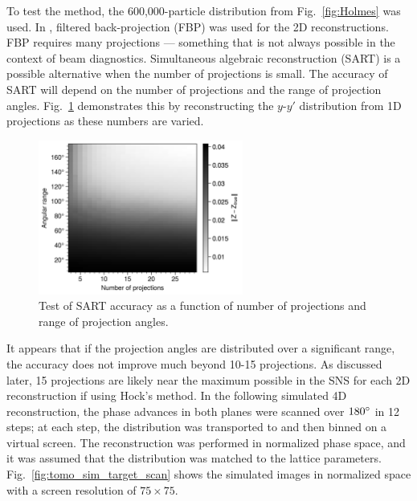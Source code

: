 To test the method, the 600,000-particle distribution from Fig.~\ref{fig:Holmes} was used. In \cite{Hock2013a}, filtered back-projection (FBP) was used for the 2D reconstructions. FBP requires many projections — something that is not always possible in the context of beam diagnostics. Simultaneous algebraic reconstruction (SART) is a possible alternative when the number of projections is small. The accuracy of SART will depend on the number of projections and the range of projection angles. Fig.~\ref{fig:tomo_sim_art2D} demonstrates this by reconstructing the $y$-$y'$ distribution from 1D projections as these numbers are varied.
%
\begin{figure}[!p]
    \centering
    \vspace*{3.0cm}
    \includegraphics[width=0.6\textwidth]{Images/chapter4/tomo_sim_art2d.png}
    \caption{Test of SART accuracy as a function of number of projections and range of projection angles.}
    \label{fig:tomo_sim_art2D}
    \vspace*{3.0cm}
\end{figure}
%
It appears that if the projection angles are distributed over a significant range, the accuracy does not improve much beyond 10-15 projections. As discussed later, 15 projections are likely near the maximum possible in the SNS for each 2D reconstruction if using Hock's method. In the following simulated 4D reconstruction, the phase advances in both planes were scanned over $180\degree$ in 12 steps; at each step, the distribution was transported to and then binned on a virtual screen. The reconstruction was performed in normalized phase space, and it was assumed that the distribution was matched to the lattice parameters. Fig.~\ref{fig:tomo_sim_target_scan} shows the simulated images in normalized space with a screen resolution of $75 \times 75$.
%
